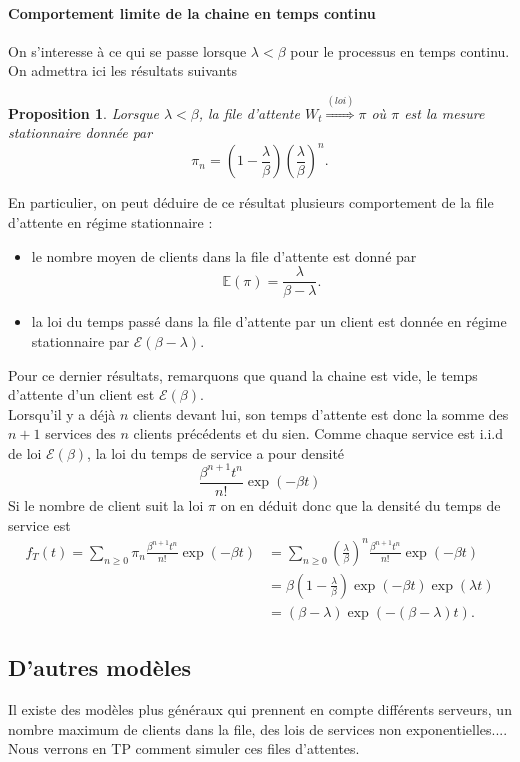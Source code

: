 \documentclass[a4paper,12pt]{book}
\newtheorem{propfr}[thmfr]{Proposition}
\newcommand{\E}{\mathbb{E}}
\begin{document}
\paragraph{Comportement limite de la chaine en temps continu}

On s'interesse à ce qui se passe lorsque  $\lambda<\beta$ pour le processus en temps continu. On admettra ici les résultats suivants
\begin{propfr}
Lorsque $\lambda<\beta$, la file d'attente $W_t\overset{(loi)}{\Longrightarrow} \pi$
où $\pi$ est la mesure stationnaire donnée par $$\pi_n=\left( 1-\frac{\lambda}{\beta}\right)\left(\frac{\lambda}{\beta}\right)^n.$$
\end{propfr}

En particulier, on peut déduire de ce résultat plusieurs comportement de la file d'attente en régime stationnaire :
\begin{itemize}
\item  le nombre moyen de clients dans la file d'attente est donné par
$$\E(\pi)=\frac{\lambda}{\beta-\lambda}.$$
\item la loi du temps passé dans la file d'attente par un client est donnée en régime stationnaire par $\mathcal{E}(\beta-\lambda)$.
\end{itemize}
Pour ce dernier résultats, remarquons que quand la chaine est vide, le temps d'attente d'un client est $\mathcal{E}(\beta)$.
\\
Lorsqu'il y a déjà $n$ clients devant lui, son temps d'attente est donc la somme des $n+1$ services des $n$ clients précédents et du sien. Comme chaque service est i.i.d de loi $\mathcal{E}(\beta)$, la loi du temps de service a pour densité
$$\frac{\beta^{n+1}t^n}{n!}\exp(-\beta t)$$
Si le nombre de client suit la loi $\pi$ on en déduit donc que la densité du temps de service est
\begin{align*}
f_T(t)=\sum_{n\ge0}\pi_n \frac{\beta^{n+1}t^n}{n!}\exp(-\beta t)
&= \sum_{n\ge0} \left(\frac{\lambda}{\beta}\right)^n\frac{\beta^{n+1}t^n}{n!}\exp(-\beta t)\\
&= \beta\left( 1-\frac{\lambda}{\beta}\right) \exp(-\beta t)\exp(\lambda t)\\
&=(\beta-\lambda)\exp(-(\beta-\lambda)t).
\end{align*}


\subsection{D'autres modèles}
Il existe des modèles plus généraux qui prennent en compte différents serveurs, un nombre maximum de clients dans la file, des lois de services non exponentielles....
Nous verrons en TP comment simuler ces files d'attentes.
\end{document}
